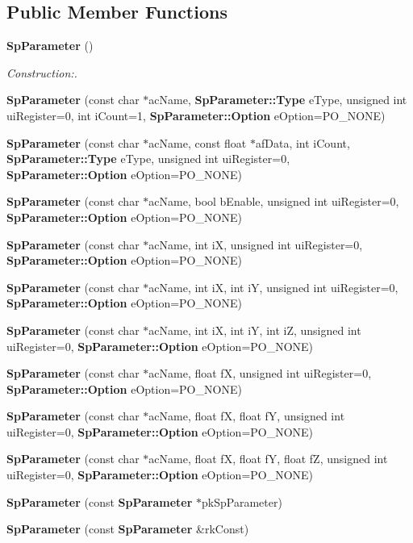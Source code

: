 \subsection*{Public Member Functions}
\begin{CompactItemize}
\item 
{\bf Sp\-Parameter} ()
\begin{CompactList}\small\item\em Construction:. \item\end{CompactList}\item 
{\bf Sp\-Parameter} (const char $\ast$ac\-Name, {\bf Sp\-Parameter::Type} e\-Type, unsigned int ui\-Register=0, int i\-Count=1, {\bf Sp\-Parameter::Option} e\-Option=PO\_\-NONE)
\item 
{\bf Sp\-Parameter} (const char $\ast$ac\-Name, const float $\ast$af\-Data, int i\-Count, {\bf Sp\-Parameter::Type} e\-Type, unsigned int ui\-Register=0, {\bf Sp\-Parameter::Option} e\-Option=PO\_\-NONE)
\item 
{\bf Sp\-Parameter} (const char $\ast$ac\-Name, bool b\-Enable, unsigned int ui\-Register=0, {\bf Sp\-Parameter::Option} e\-Option=PO\_\-NONE)
\item 
{\bf Sp\-Parameter} (const char $\ast$ac\-Name, int i\-X, unsigned int ui\-Register=0, {\bf Sp\-Parameter::Option} e\-Option=PO\_\-NONE)
\item 
{\bf Sp\-Parameter} (const char $\ast$ac\-Name, int i\-X, int i\-Y, unsigned int ui\-Register=0, {\bf Sp\-Parameter::Option} e\-Option=PO\_\-NONE)
\item 
{\bf Sp\-Parameter} (const char $\ast$ac\-Name, int i\-X, int i\-Y, int i\-Z, unsigned int ui\-Register=0, {\bf Sp\-Parameter::Option} e\-Option=PO\_\-NONE)
\item 
{\bf Sp\-Parameter} (const char $\ast$ac\-Name, float f\-X, unsigned int ui\-Register=0, {\bf Sp\-Parameter::Option} e\-Option=PO\_\-NONE)
\item 
{\bf Sp\-Parameter} (const char $\ast$ac\-Name, float f\-X, float f\-Y, unsigned int ui\-Register=0, {\bf Sp\-Parameter::Option} e\-Option=PO\_\-NONE)
\item 
{\bf Sp\-Parameter} (const char $\ast$ac\-Name, float f\-X, float f\-Y, float f\-Z, unsigned int ui\-Register=0, {\bf Sp\-Parameter::Option} e\-Option=PO\_\-NONE)
\item 
{\bf Sp\-Parameter} (const {\bf Sp\-Parameter} $\ast$pk\-Sp\-Parameter)
\item 
{\bf Sp\-Parameter} (const {\bf Sp\-Parameter} \&rk\-Const)

\end{CompactItemize}
